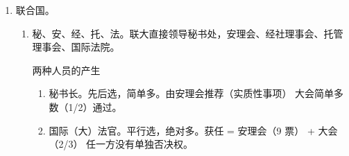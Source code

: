 \begin{enumerate}
\begin{enumerate}
\begin{enumerate}
                  \item 明示默示。外交关系，互设使馆；领事关系；政治性条约（）；联合国正式投票。
                  \item 是单方行为（最最重要）。拒绝承认不是剥夺国际法主体资格的方式。
                  \item 承认新国家不可逆，承认新政府意味着对旧政府承认的撤销。
                  \item 事实上的承认。与对方交往又不构成法律的承认。不要求掌握。
                \end{enumerate}
          \item 继承。条约、财产、档案和债务。协议优先。考一头一尾。
                \begin{enumerate}
                  \item 条约。领土划界有关的必须继承。
                  \item 财产、档案。领土实际生存原则。不看在哪，看土地归了谁。考不着。
                  \item 债务。严格意义的国家非恶债。
                        \begin{enumerate}
                          \item 举债主体是一国中央政府，借债对象是其他国际法主体。地方债、个人、商业银行均不属于。
                          \item 平等条约产生。
                          \item 继承方式。\yi 合并，全部。\er 分离分立，比例。。\san （殖民地）独立，不予继承。
                        \end{enumerate}
                \end{enumerate}
        \end{enumerate}
  \item 联合国。
        \begin{enumerate}
          \item 秘、安、经、托、法。联大直接领导秘书处，安理会、经社理事会、托管理事会、国际法院。
                \begin{kk}{两种人员的产生}
                  \begin{enumerate}
                    \item 秘书长。先后选，简单多。由安理会推荐（实质性事项） \yjt 大会简单多数（1/2）通过。
                    \item 国际（大）法官。平行选，绝对多。获任 = 安理会（9 票） + 大会（2/3） \yjt 任一方没有单独否决权。
                  \end{enumerate}
                \end{kk}

\end{enumerate}
\end{enumerate}
